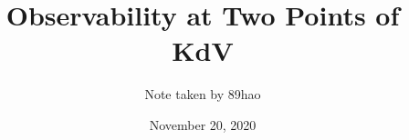 \documentclass[a4paper,12pt]{article}
\begin{document}
\title{Observability at Two Points of KdV}
\author{\large Note taken by 89hao}
\date{November 20, 2020}  
\maketitle


%
%
\printbibliography
\end{document}
